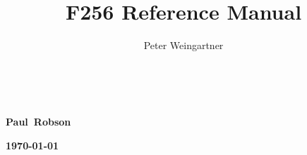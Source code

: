 \documentclass[oneside]{book}
\begin{document}
\lstset{language=BASIC}

\title{F256  Reference Manual}
\author{Peter Weingartner}
\begin{titlepage}
    \colorbox{silver}{ \\
    }

    \vfill

    \hfill\mbox{\color{primary}\bfseries\sffamily\Large Paul Robson}

    \hfill\mbox{\color{primary}\bfseries\sffamily\large \today}
\end{titlepage}

\tableofcontents












\end{document}
